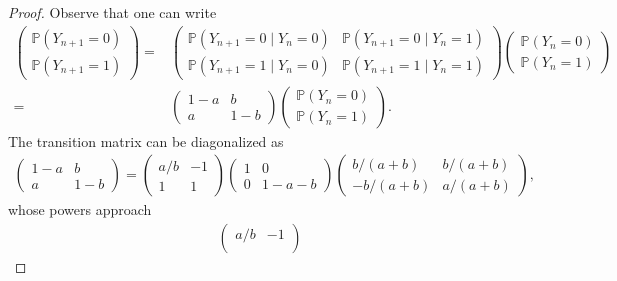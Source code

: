 \documentclass[12pt,reqno]{amsart}
\theoremstyle{plain} %
\theoremstyle{remark}
\theoremstyle{definition}
\renewcommand{\P}{\mathbb P}
\begin{document}
\begin{proof}
    Observe that one can write
    \begin{align}
        \begin{pmatrix}
            \P(Y_{n+1}=0)\\
            \P(Y_{n+1}=1)
        \end{pmatrix}
        =&\begin{pmatrix}
            \P(Y_{n+1}=0\mid Y_{n}=0) & \P(Y_{n+1}=0\mid Y_{n}=1)\\
            \P(Y_{n+1}=1\mid Y_{n}=0) & \P(Y_{n+1}=1\mid Y_{n}=1)
        \end{pmatrix}
        \begin{pmatrix}
            \P(Y_{n}=0)\\
            \P(Y_{n}=1)
        \end{pmatrix}\\
        =&\begin{pmatrix}
            1-a & b\\
            a & 1-b
        \end{pmatrix}
        \begin{pmatrix}
            \P(Y_{n}=0)\\
            \P(Y_{n}=1)
        \end{pmatrix}.
    \end{align}
The transition matrix can be diagonalized as
\begin{align}
    \begin{pmatrix}
            1-a & b\\
            a & 1-b
        \end{pmatrix}
        =\begin{pmatrix}
            a/b & -1\\
            1 & 1
        \end{pmatrix}
        \begin{pmatrix}
            1 & 0\\
            0 & 1-a-b
        \end{pmatrix}
        \begin{pmatrix}
            b/(a+b) & b/(a+b)\\
            -b/(a+b) & a/(a+b)
        \end{pmatrix},
\end{align}
whose powers approach
\begin{align}
    \begin{pmatrix}
            a/b & -1\\

\end{pmatrix}
\end{align}
\end{proof}
\end{document}
